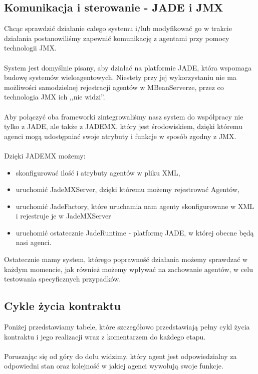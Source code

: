 \documentclass[a4paper,12pt]{article}
\begin{document}
\newpage

\subsection{Komunikacja i sterowanie - JADE i JMX}

Chcąc sprawdzić działanie całego systemu i/lub modyfikować go w trakcie działania postanowiliśmy zapewnić komunikację z agentami przy pomocy technologii JMX.
\\ \\
System jest domyślnie pisany, aby działać na platformie JADE, która wspomaga budowę systemów wieloagentowych. Niestety przy jej wykorzystaniu nie ma możliwości samodzielnej rejestracji agentów w MBeanServerze, przez co technologia JMX ich ,,nie widzi''.
\\ \\
Aby połączyć oba frameworki zintegrowaliśmy nasz system do współpracy nie tylko z JADE, ale także z JADEMX, który jest środowiskiem, dzięki któremu agenci mogą udostępniać swoje atrybuty i funkcje w sposób zgodny z JMX.
\\ \\
Dzięki JADEMX możemy:
\begin{itemize}
\item skonfigurować ilość i atrybuty agentów w pliku XML,
\item uruchomić JadeMXServer, dzięki któremu możemy rejestrować Agentów,
\item uruchomić JadeFactory, które uruchamia nam agenty skonfigurowane w XML i rejestruje je w JadeMXServer
\item uruchomić ostatecznie JadeRuntime - platformę JADE, w której obecne będą nasi agenci.
\end{itemize}

Ostatecznie mamy system, którego poprawność działania możemy sprawdzać w każdym momencie, jak również możemy wpływać na zachowanie agentów, w celu testowania specyficznych przypadków.

\newpage

\subsection{Cykle życia kontraktu}

Poniżej przedstawiamy tabele, które szczegółowo przedstawiają pełny cykl życia kontraktu i jego realizacji wraz z komentarzem do każdego etapu.
\\ \\
Poruszając się od góry do dołu widzimy, który agent jest odpowiedzialny za odpowiedni stan oraz kolejność w jakiej agenci wywołują swoje funkcje.
\end{document}
